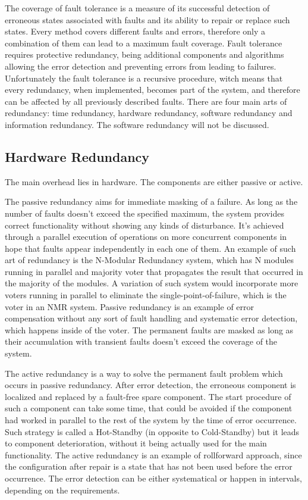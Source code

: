 The coverage of fault tolerance is a measure of its successful detection of erroneous states associated with faults and its ability to repair or replace such states. Every method covers different faults and errors, therefore only a combination of them can lead to a maximum fault coverage.
Fault tolerance requires protective redundancy, being additional components and algorithms allowing the error detection and preventing errors from leading to failures. Unfortunately the fault tolerance is a recursive procedure, witch means that every redundancy, when implemented, becomes part of the system, and therefore can be affected by all previously described faults.
There are four main arts of redundancy: time redundancy, hardware redundancy, software redundancy and information redundancy. The software redundancy will not be discussed.
\subsection{Hardware Redundancy} \label{ssec:HWred}
The main overhead lies in hardware. The components are either passive or active. 

The passive redundancy aims for immediate masking of a failure. As long as the number of faults doesn't exceed the specified maximum, the system provides correct functionality without showing any kinds of disturbance. It's achieved through a parallel execution of operations on more concurrent components in hope that faults appear independently in each one of them. An example of such art of redundancy is the N-Modular Redundancy system, which has N modules running in parallel and majority voter that propagates the result that occurred in the majority of the modules. A variation of such system would incorporate more voters running in parallel to eliminate the single-point-of-failure, which is the voter in an NMR system. Passive redundancy is an example of error compensation without any sort of fault handling and systematic error detection, which happens inside of the voter. The permanent faults are masked as long as their accumulation with transient faults doesn't exceed the coverage of the system.

The active redundancy is a way to solve the permanent fault problem which occurs in passive redundancy. After error detection, the erroneous component is localized and replaced by a fault-free spare component. The start procedure of such a component can take some time, that could be avoided if the component had worked in parallel to the rest of the system by the time of error occurrence. Such strategy is called a Hot-Standby (in opposite to Cold-Standby) but it leads to component deterioration, without it being actually used for the main functionality. The active redundancy is an example of rollforward approach, since the configuration after repair is a state that has not been used before the error occurrence. The error detection can be either systematical or happen in intervals, depending on the requirements.

